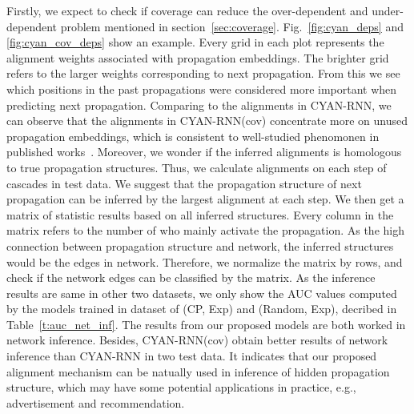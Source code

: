 Firstly, we expect to check if coverage can reduce the over-dependent and
under-dependent problem mentioned in section~\ref{sec:coverage}.
Fig.~\ref{fig:cyan_deps} and \ref{fig:cyan_cov_deps} show an example. Every grid
in each plot represents the alignment weights associated with propagation
embeddings.
The brighter grid refers to the larger weights corresponding to next
propagation. From this we see which positions in the past propagations
were considered more important when predicting next propagation. Comparing to
the alignments in CYAN-RNN, we can observe that the alignments in CYAN-RNN(cov)
concentrate more on unused propagation embeddings, which is consistent to
well-studied phenomonen in published works~\cite{}. Moreover, we wonder if the
inferred alignments is homologous to true propagation structures. Thus, we
calculate alignments on each step of cascades in test data. We suggest that the
propagation structure of next propagation can be inferred by the largest
alignment at each step. We then get a matrix of statistic results based on all inferred
structures. Every column in the matrix refers to the number of who mainly
activate the propagation. As the high connection between propagation
structure and network, the inferred structures would be the edges in
network. Therefore, we normalize the matrix by rows, and check if the
network edges can be classified by the matrix. As the
inference results are same in other two datasets, we only show the AUC values
computed by the models trained in dataset of (CP, Exp) and (Random, Exp),
decribed in Table~\ref{t:auc_net_inf}. The results from our proposed models
are both worked in network inference. Besides, CYAN-RNN(cov) obtain better results of
network inference than CYAN-RNN in two test data. It indicates that our
proposed alignment mechanism can be natually used in inference of hidden
propagation structure, which may have some potential applications in practice,
e.g., advertisement and recommendation.


\begin{figure}
\centering
{}
\caption{
}
\end{figure}

